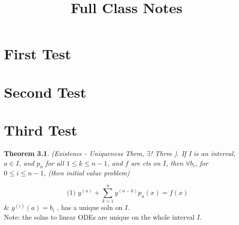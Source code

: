 \documentclass{book}
\title{Full Class Notes}
\author{ }
\date{ }
\newtheorem*{theorem}{Theorem}
\theoremstyle{definition}
\begin{document}
\maketitle
\newpage

\tableofcontents{}

\chapter{First Test}


\chapter{Second Test}


\chapter{Third Test}




\begin{theorem}
  (Existence - Uniqueness Thrm, \( \exists \)! Thrm ). If I is an
  interval, \( a \in I \), and \( p_u \) for all \( 1 \leq k \leq n-1 \),
  and \( f \) are cts on \( I \), then 
  \( \forall b_i \), for \( 0 \leq i \leq n-1 \), (then initial value problem)  
\end{theorem}

\[ \text{ (1) } y^{(n)} + \sum_{k=1}^n y^{(n-k)} p_u(x) = f(x) \]
\& \( y^{(i)} (a) = b_i  \) , has a unique soln on \( I \). \\
Note: the solns to linear ODEs are unique on the whole interval \( I
\).\\[5mm]
\end{document}
